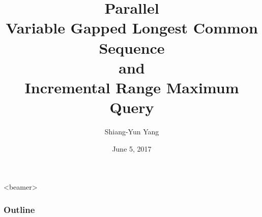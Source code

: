 \documentclass{beamer}
\title{Parallel \\
Variable Gapped Longest Common Sequence \\ and \\ 
Incremental Range Maximum Query}
\author{Shiang-Yun Yang}
\institute{Department of Computer Science \& Information Engineering,\\
National Taiwan University}
\date{June 5, 2017}
\begin{document}
\begin{frame}
    \titlepage
\end{frame}

\begin{frame}<beamer>
    \frametitle{Outline}
    \setcounter{tocdepth}{1}
    \tableofcontents
\end{frame}











\appendix

\end{document}

